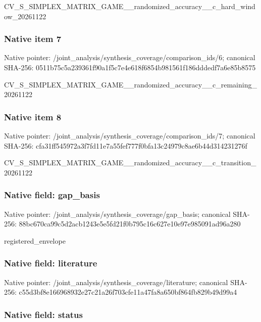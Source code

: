 \documentclass[10pt,a4paper]{article}
\begin{document}
CV\_S\_SIMPLEX\_MATRIX\_GAME\allowbreak{}\_\_randomized\_accuracy\_\_c\allowbreak{}\_hard\_window\_20261122


\subsubsection{Native item 7}


Native pointer: /joint\_analysis/synthesi\allowbreak{}s\_coverage/comparison\_id\allowbreak{}s/6; canonical SHA-256: 0511b75c5a239361f90a1f5c\allowbreak{}7e4e618f6854b981561f186d\allowbreak{}ddedf7a6e85b8575


CV\_S\_SIMPLEX\_MATRIX\_GAME\allowbreak{}\_\_randomized\_accuracy\_\_c\allowbreak{}\_remaining\_20261122


\subsubsection{Native item 8}


Native pointer: /joint\_analysis/synthesi\allowbreak{}s\_coverage/comparison\_id\allowbreak{}s/7; canonical SHA-256: cfa31ff545972a3f7fd11e7a\allowbreak{}55fef777f0bfa13c24979c8a\allowbreak{}e6b44d314231276f


CV\_S\_SIMPLEX\_MATRIX\_GAME\allowbreak{}\_\_randomized\_accuracy\_\_c\allowbreak{}\_transition\_20261122


\subsubsection{Native field: gap\_basis}


Native pointer: /joint\_analysis/synthesi\allowbreak{}s\_coverage/gap\_basis; canonical SHA-256: 88bc670ca99c5d2acb1243e5\allowbreak{}e5fd21f0b795c16c627e10e9\allowbreak{}7e985091ad96a280


registered\_envelope


\subsubsection{Native field: literature}


Native pointer: /joint\_analysis/synthesi\allowbreak{}s\_coverage/literature; canonical SHA-256: c55d3bf8e166968932e27c21\allowbreak{}a26f703cfe11a47fa8a650bf\allowbreak{}864fb829b49d99a4



\subsubsection{Native field: status}
\end{document}
